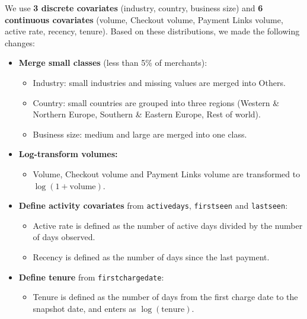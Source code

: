 \documentclass[11pt]{article}
\newcommand{\code}[1]{\begingroup\renewcommand{\_}{\textunderscore\allowbreak}\texttt{#1}\endgroup}  %
\begin{document}
We use \textbf{3 discrete covariates} (industry, country, business size) and \textbf{6 continuous covariates} (volume, Checkout volume, Payment Links volume, active rate, recency, tenure). Based on these distributions, we made the following changes:
\begin{itemize}
  \item \textbf{Merge small classes} (less than 5\% of merchants):
  \begin{itemize}
    \item Industry: small industries and missing values are merged into Others.
    \item Country: small countries are grouped into three regions (Western \& Northern Europe, Southern \& Eastern Europe, Rest of world).
    \item Business size: medium and large are merged into one class.
  \end{itemize}
  \item \textbf{Log-transform volumes:}
  \begin{itemize}
    \item Volume, Checkout volume and Payment Links volume are transformed to $\log(1 + \text{volume})$.
  \end{itemize}
  \item \textbf{Define activity covariates} from \code{active\_days}, \code{first\_seen} and \code{last\_seen}:
  \begin{itemize}
    \item Active rate is defined as the number of active days divided by the number of days observed.
    \item Recency is defined as the number of days since the last payment.
  \end{itemize}
  \item \textbf{Define tenure} from \code{first\_charge\_date}:
  \begin{itemize}
    \item Tenure is defined as the number of days from the first charge date to the snapshot date, and enters as $\log(\text{tenure})$.
  \end{itemize}
\end{itemize}
\end{document}
